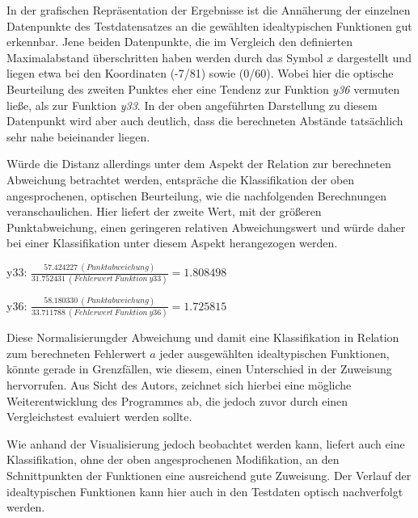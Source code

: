 In der grafischen Repräsentation der Ergebnisse ist die Annäherung der einzelnen Datenpunkte des Testdatensatzes an die gewählten idealtypischen Funktionen gut erkennbar. Jene beiden Datenpunkte, die im Vergleich den definierten Maximalabstand überschritten haben werden durch das Symbol $x$ dargestellt und liegen etwa bei den Koordinaten (-7/81) sowie (0/60). Wobei hier die optische Beurteilung des zweiten Punktes eher eine Tendenz zur Funktion \emph{y36} vermuten ließe, als zur Funktion \emph{y33}. In der oben angeführten Darstellung zu diesem Datenpunkt wird aber auch deutlich, dass die berechneten Abstände tatsächlich sehr nahe beieinander liegen.

Würde die Distanz allerdings unter dem Aspekt der Relation zur berechneten Abweichung betrachtet werden, entspräche die Klassifikation der oben angesprochenen, optischen Beurteilung, wie die nachfolgenden Berechnungen veranschaulichen. Hier liefert der zweite Wert, mit der größeren Punktabweichung, einen geringeren relativen Abweichungswert und würde daher bei einer Klassifikation unter diesem Aspekt herangezogen werden. 

\begin{center}
y33: $ \frac{57.424227\ (Punktabweichung)}{31.752431\ (Fehlerwert\ Funktion\ y33)} = 1.808498 $ 
\end{center}

\begin{center}
y36: $ \frac{58.180330\ (Punktabweichung)}{33.711788\ (Fehlerwert\ Funktion\ y36)} = 1.725815 $
\end{center}

Diese \glqq Normalisierung\grqq der Abweichung und damit eine Klassifikation in Relation zum berechneten Fehlerwert $a$ jeder ausgewählten idealtypischen Funktionen, könnte gerade in Grenzfällen, wie diesem, einen Unterschied in der Zuweisung hervorrufen. Aus Sicht des Autors, zeichnet sich hierbei eine mögliche Weiterentwicklung des Programmes ab, die jedoch zuvor durch einen Vergleichstest evaluiert werden sollte.

Wie anhand der Visualisierung jedoch beobachtet werden kann, liefert auch eine Klassifikation, ohne der oben angesprochenen Modifikation, an den Schnittpunkten der Funktionen eine ausreichend gute Zuweisung. Der Verlauf der idealtypischen Funktionen kann hier auch in den Testdaten optisch nachverfolgt werden.

